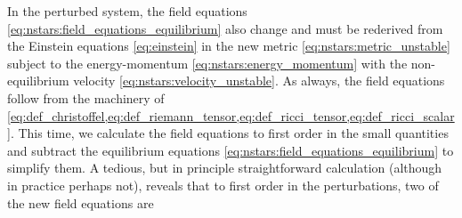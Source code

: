 In the perturbed system, the field equations \eqref{eq:nstars:field_equations_equilibrium} also change and must be rederived from the Einstein equations \eqref{eq:einstein} in the new metric \eqref{eq:nstars:metric_unstable} subject to the energy-momentum \eqref{eq:nstars:energy_momentum} with the non-equilibrium velocity \eqref{eq:nstars:velocity_unstable}.
As always, the field equations follow from the machinery of \cref{eq:def_christoffel,eq:def_riemann_tensor,eq:def_ricci_tensor,eq:def_ricci_scalar}.
This time, we calculate the field equations to first order in the small quantities and subtract the equilibrium equations \eqref{eq:nstars:field_equations_equilibrium} to simplify them.
A tedious, but in principle straightforward calculation (although in practice perhaps not), reveals that to first order in the perturbations, two of the new field equations are
